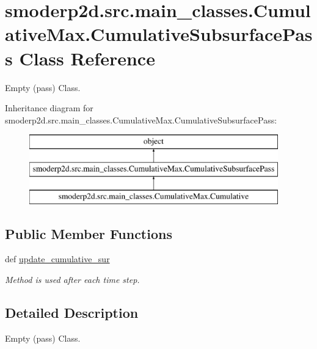 \hypertarget{classsmoderp2d_1_1src_1_1main__classes_1_1CumulativeMax_1_1CumulativeSubsurfacePass}{\section{smoderp2d.\-src.\-main\-\_\-classes.\-Cumulative\-Max.\-Cumulative\-Subsurface\-Pass Class Reference}
\label{classsmoderp2d_1_1src_1_1main__classes_1_1CumulativeMax_1_1CumulativeSubsurfacePass}
}


Empty (pass) Class.  


Inheritance diagram for smoderp2d.\-src.\-main\-\_\-classes.\-Cumulative\-Max.\-Cumulative\-Subsurface\-Pass\-:\begin{figure}[H]
\begin{center}
\leavevmode
\includegraphics[height=3.000000cm]{d4/d62/classsmoderp2d_1_1src_1_1main__classes_1_1CumulativeMax_1_1CumulativeSubsurfacePass}
\end{center}
\end{figure}
\subsection*{Public Member Functions}
\begin{DoxyCompactItemize}
\item 
def \hyperlink{classsmoderp2d_1_1src_1_1main__classes_1_1CumulativeMax_1_1CumulativeSubsurfacePass_a4cd34bafce5287c9f1ca7ebcf1f941a6}{update\-\_\-cumulative\-\_\-sur}
\begin{DoxyCompactList}\small\item\em Method is used after each time step. \end{DoxyCompactList}\end{DoxyCompactItemize}


\subsection{Detailed Description}
Empty (pass) Class. 

